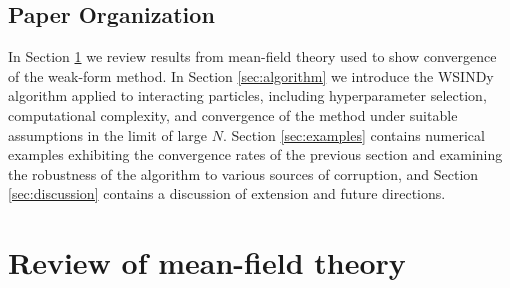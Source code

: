 \documentclass[english,reqno]{amsart}
\begin{document}
\subsection{Paper Organization}

In Section \ref{sec:meanfield} we review results from mean-field theory used to show convergence of the weak-form method. In Section \ref{sec:algorithm} we introduce the WSINDy algorithm applied to interacting particles, including hyperparameter selection, computational complexity, and convergence of the method under suitable assumptions in the limit of large $N$. Section \ref{sec:examples} contains numerical examples exhibiting the convergence rates of the previous section and examining the robustness of the algorithm to various sources of corruption, and Section \ref{sec:discussion} contains a discussion of extension and future directions.

\section{Review of mean-field theory}\label{sec:meanfield}
\end{document}
